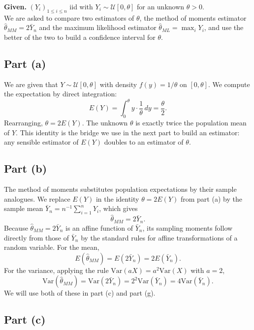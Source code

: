 

\noindent \textbf{Given.} $(Y_i)_{1 \le i \le n}$ iid with $Y_i \sim \mathcal{U}[0, \theta]$ for an unknown $\theta > 0$. \\

We are asked to compare two estimators of $\theta$, the method of moments estimator $\widehat\theta_{MM} = 2 \bar Y_n$ and the maximum likelihood estimator $\widehat\theta_{ML} = \max_i Y_i$, and use the better of the two to build a confidence interval for $\theta$.

\subsection*{Part (a)}

We are given that $Y \sim \mathcal{U}[0, \theta]$ with density $f(y) = 1/\theta$ on $[0, \theta]$. We compute the expectation by direct integration:
\[
E(Y) = \int_0^\theta y \cdot \frac{1}{\theta}\, dy = \frac{\theta}{2}.
\]
Rearranging, $\theta = 2 E(Y)$. The unknown $\theta$ is exactly twice the population mean of $Y$. This identity is the bridge we use in the next part to build an estimator: any sensible estimator of $E(Y)$ doubles to an estimator of $\theta$.

\subsection*{Part (b)}

The method of moments substitutes population expectations by their sample analogues. We replace $E(Y)$ in the identity $\theta = 2 E(Y)$ from part (a) by the sample mean $\bar Y_n = n^{-1} \sum_{i=1}^n Y_i$, which gives
\[
\widehat\theta_{MM} = 2 \bar Y_n.
\]
Because $\widehat\theta_{MM} = 2 \bar Y_n$ is an affine function of $\bar Y_n$, its sampling moments follow directly from those of $\bar Y_n$ by the standard rules for affine transformations of a random variable. For the mean,
\[
E(\widehat\theta_{MM}) = E(2 \bar Y_n) = 2 E(\bar Y_n).
\]
For the variance, applying the rule $\mathrm{Var}(a X) = a^2 \mathrm{Var}(X)$ with $a = 2$,
\[
\mathrm{Var}(\widehat\theta_{MM}) = \mathrm{Var}(2 \bar Y_n) = 2^2 \mathrm{Var}(\bar Y_n) = 4 \mathrm{Var}(\bar Y_n).
\]
We will use both of these in part (c) and part (g).

\subsection*{Part (c)}


